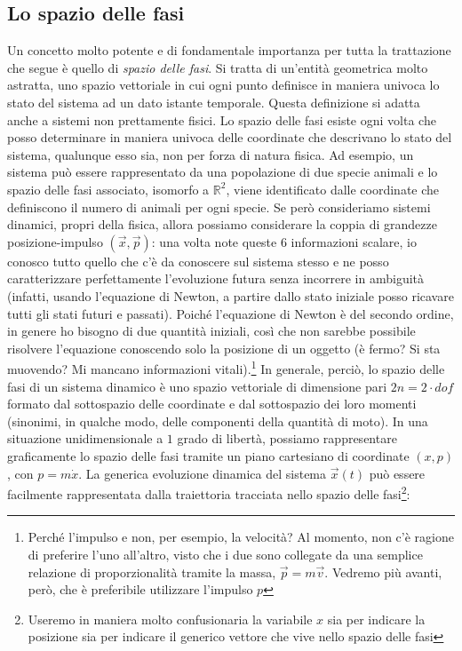 \documentclass[a4paper,openany]{article}
\begin{document}
	\subsection{Lo spazio delle fasi}
	Un concetto molto potente e di fondamentale importanza per tutta la trattazione che segue è quello di \textit{spazio delle fasi}. Si tratta di un'entità geometrica molto astratta, uno spazio vettoriale in cui ogni punto definisce in maniera univoca lo stato del sistema ad un dato istante temporale. Questa definizione si adatta anche a sistemi non prettamente fisici. Lo spazio delle fasi esiste ogni volta che posso determinare in maniera univoca delle coordinate che descrivano lo stato del sistema, qualunque esso sia, non per forza di natura fisica. Ad esempio, un sistema può essere rappresentato da una popolazione di due specie animali e lo spazio delle fasi associato, isomorfo a $\mathbb{R}^{2}$, viene identificato dalle coordinate che definiscono il numero di animali per ogni specie. Se però consideriamo sistemi dinamici, propri della fisica, allora possiamo considerare la coppia di grandezze posizione-impulso $(\vec{x},\vec{p})$: una volta note queste $6$ informazioni scalare, io conosco tutto quello che c'è da conoscere sul sistema stesso e ne posso caratterizzare perfettamente l'evoluzione futura senza incorrere in ambiguità (infatti, usando l'equazione di Newton, a partire dallo stato iniziale posso ricavare tutti gli stati futuri e passati). Poiché l'equazione di Newton è del secondo ordine, in genere ho bisogno di due quantità iniziali, così che non sarebbe possibile risolvere l'equazione conoscendo solo la posizione di un oggetto (è fermo? Si sta muovendo? Mi mancano informazioni vitali).\footnote{Perché l'impulso e non, per esempio, la velocità? Al momento, non c'è ragione di preferire l'uno all'altro, visto che i due sono collegate da una semplice relazione di proporzionalità tramite la massa, $\vec{p} = m\vec{v}$. Vedremo più avanti, però, che è preferibile utilizzare l'impulso $p$}
	In generale, perciò, lo spazio delle fasi di un sistema dinamico è uno spazio vettoriale di dimensione pari $2n = 2\cdot dof$ formato dal sottospazio delle coordinate e dal sottospazio dei loro momenti (sinonimi, in qualche modo, delle componenti della quantità di moto). In una situazione unidimensionale a $1$ grado di libertà, possiamo rappresentare graficamente lo spazio delle fasi tramite un piano cartesiano di coordinate $(x,p)$, con $p = m\dot{x}$. La generica evoluzione dinamica del sistema $\vec{x}(t)$ può essere facilmente rappresentata dalla traiettoria tracciata nello spazio delle fasi\footnote{Useremo in maniera molto confusionaria la variabile $x$ sia per indicare la posizione sia per indicare il generico vettore che vive nello spazio delle fasi}:
\end{document}

